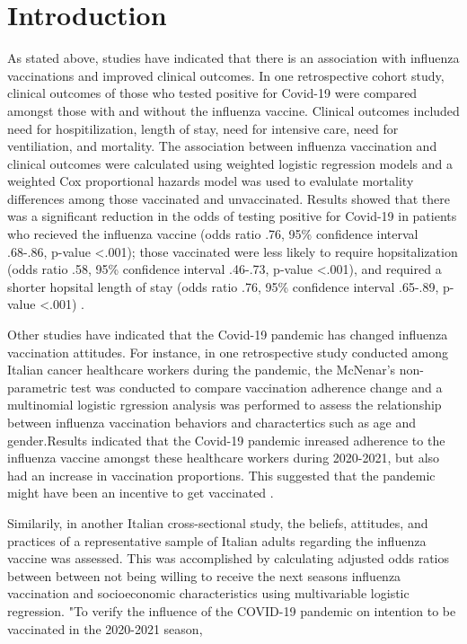 \documentclass[12pt]{article}
\begin{document}
\section{Introduction}
\label{sec:Introduction}
As stated above, studies have indicated that there is an association with influenza vaccinations and improved clinical outcomes. In one retrospective cohort study, clinical outcomes of those who tested
positive for Covid-19 were compared amongst those with and without the influenza vaccine. Clinical outcomes included need for hospitilization, length of stay, need for intensive care, need for ventiliation,
and mortality. The association between influenza vaccination and clinical outcomes were calculated using weighted logistic regression models and a weighted Cox proportional hazards model was used to evalulate
mortality differences among those vaccinated and unvaccinated. Results showed that there was a significant reduction in the odds of testing positive for Covid-19 in patients who recieved the influenza vaccine
(odds ratio .76, 95\% confidence interval .68-.86, p-value <.001); those vaccinated were less likely to require hopsitalization (odds ratio .58, 95\% confidence interval .46-.73, p-value <.001), and required a
shorter hopsital length of stay (odds ratio .76, 95\% confidence interval .65-.89, p-value <.001) \citep{conlon2021impact}. \par
Other studies have indicated that the Covid-19 pandemic has changed influenza vaccination attitudes. For instance, in one retrospective study conducted among Italian cancer healthcare workers during the pandemic, the McNenar's non-parametric
test was conducted to compare vaccination adherence change and a multinomial logistic rgression analysis was performed to assess the relationship between influenza vaccination behaviors and charactertics such as age and gender.Results indicated
that the Covid-19 pandemic inreased adherence to the influenza vaccine amongst these healthcare workers during 2020-2021, but also had an increase in vaccination proportions. This suggested that the pandemic might have been an incentive to get vaccinated
\citep{bertoni2022has}. \par
Similarily, in another Italian cross-sectional study, the beliefs, attitudes, and practices of a representative sample of Italian adults regarding the influenza vaccine was assessed. This was accomplished by calculating adjusted odds ratios between
between not being willing to receive the next seasons influenza vaccination and socioeconomic characteristics using multivariable logistic regression. "To verify the influence of the COVID-19 pandemic on intention to be vaccinated in the 2020-2021 season, 
\end{document}
